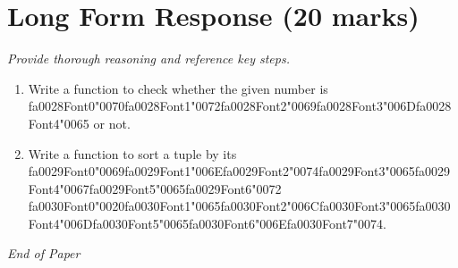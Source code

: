 \documentclass[12pt]{article}
\begin{document}
\section*{Long Form Response (20 marks)}
\textit{Provide thorough reasoning and reference key steps.}
\begin{enumerate}[label=\arabic*.]
\item Write a function to check whether the given number is {\csname fa0028Font0\endcsname\char"0070}{\csname fa0028Font1\endcsname\char"0072}{\csname fa0028Font2\endcsname\char"0069}{\csname fa0028Font3\endcsname\char"006D}{\csname fa0028Font4\endcsname\char"0065} or not.
\item Write a function to sort a tuple by its {\csname fa0029Font0\endcsname\char"0069}{\csname fa0029Font1\endcsname\char"006E}{\csname fa0029Font2\endcsname\char"0074}{\csname fa0029Font3\endcsname\char"0065}{\csname fa0029Font4\endcsname\char"0067}{\csname fa0029Font5\endcsname\char"0065}{\csname fa0029Font6\endcsname\char"0072} {\csname fa0030Font0\endcsname\char"0020}{\csname fa0030Font1\endcsname\char"0065}{\csname fa0030Font2\endcsname\char"006C}{\csname fa0030Font3\endcsname\char"0065}{\csname fa0030Font4\endcsname\char"006D}{\csname fa0030Font5\endcsname\char"0065}{\csname fa0030Font6\endcsname\char"006E}{\csname fa0030Font7\endcsname\char"0074}.
\end{enumerate}

\vfill
\noindent\textit{End of Paper}
\end{document}

